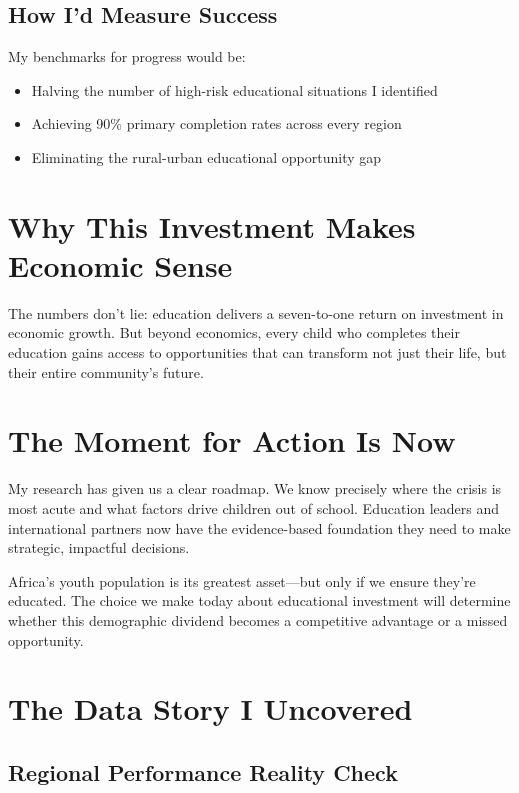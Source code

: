 \documentclass[12pt,a4paper]{article}
\begin{document}
\subsection{How I'd Measure Success}

My benchmarks for progress would be:

\begin{itemize}
    \item Halving the number of high-risk educational situations I identified
    \item Achieving 90\% primary completion rates across every region
    \item Eliminating the rural-urban educational opportunity gap
\end{itemize}

\section{Why This Investment Makes Economic Sense}

The numbers don't lie: education delivers a seven-to-one return on investment in economic growth. But beyond economics, every child who completes their education gains access to opportunities that can transform not just their life, but their entire community's future.

\section{The Moment for Action Is Now}

My research has given us a clear roadmap. We know precisely where the crisis is most acute and what factors drive children out of school. Education leaders and international partners now have the evidence-based foundation they need to make strategic, impactful decisions.

Africa's youth population is its greatest asset---but only if we ensure they're educated. The choice we make today about educational investment will determine whether this demographic dividend becomes a competitive advantage or a missed opportunity.

\section{The Data Story I Uncovered}

\subsection{Regional Performance Reality Check}
\end{document}
